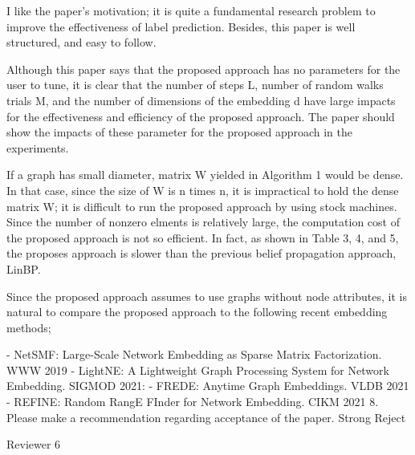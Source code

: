 I like the paper's motivation; it is quite a fundamental research problem to improve the effectiveness of label prediction. Besides, this paper is well structured, and easy to follow.

Although this paper says that the proposed approach has no parameters for the user to tune, it is clear that the number of steps L, number of random walks trials M, and the number of dimensions of the embedding d have large impacts for the effectiveness and efficiency of the proposed approach. The paper should show the impacts of these parameter for the proposed approach in the experiments.

If a graph has small diameter, matrix W yielded in Algorithm 1 would be dense. In that case, since the size of W is n times n, it is impractical to hold the dense matrix W; it is difficult to run the proposed approach by using stock machines. Since the number of nonzero elments is relatively large, the computation cost of the proposed approach is not so efficient. In fact, as shown in Table 3, 4, and 5, the proposes approach is slower than the previous belief propagation approach, LinBP.

Since the proposed approach assumes to use graphs without node attributes, it is natural to compare the proposed approach to the following recent embedding methods;

- NetSMF: Large-Scale Network Embedding as Sparse Matrix Factorization. WWW 2019
- LightNE: A Lightweight Graph Processing System for Network Embedding. SIGMOD 2021:
- FREDE: Anytime Graph Embeddings. VLDB 2021
- REFINE: Random RangE FInder for Network Embedding. CIKM 2021
8. Please make a recommendation regarding acceptance of the paper.
Strong Reject

Reviewer 6

